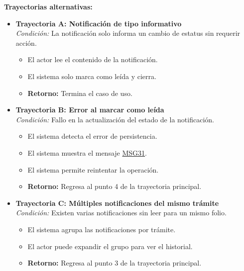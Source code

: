 \begin{appendices}
\textbf{Trayectorias alternativas:}
\begin{itemize}[leftmargin=*]
    \item \textbf{Trayectoria A: Notificación de tipo informativo} \\
    \textit{Condición:} La notificación solo informa un cambio de estatus sin requerir acción.
    \begin{itemize}[nosep]
        \item[A-1:] El actor lee el contenido de la notificación.
        \item[A-2:] El sistema solo marca como leída y cierra.
        \item \textbf{Retorno:} Termina el caso de uso.
    \end{itemize}
    \item \textbf{Trayectoria B: Error al marcar como leída} \\
    \textit{Condición:} Fallo en la actualización del estado de la notificación.
    \begin{itemize}[nosep]
        \item[B-1:] El sistema detecta el error de persistencia.
        \item[B-2:] El sistema muestra el mensaje \hyperlink{msg:MSG31}{MSG31}.
        \item[B-3:] El sistema permite reintentar la operación.
        \item \textbf{Retorno:} Regresa al punto 4 de la trayectoria principal.
    \end{itemize}
    \item \textbf{Trayectoria C: Múltiples notificaciones del mismo trámite} \\
    \textit{Condición:} Existen varias notificaciones sin leer para un mismo folio.
    \begin{itemize}[nosep]
        \item[C-1:] El sistema agrupa las notificaciones por trámite.
        \item[C-2:] El actor puede expandir el grupo para ver el historial.
        \item \textbf{Retorno:} Regresa al punto 3 de la trayectoria principal.
    \end{itemize}
\end{itemize}

\newpage


\end{appendices}
